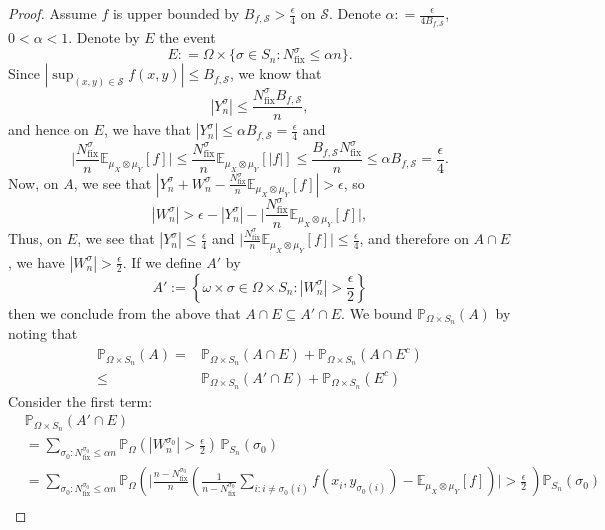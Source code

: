 \documentclass[12pt]{article}
\newcommand{\EE}{\mathbb{E}}
\newcommand{\PP}{\mathbb{P}}
\theoremstyle{definition}
\begin{document}
\begin{proof}
Assume $f$ is upper bounded by $B_{f,\mathcal{S}}>\frac{\epsilon}{4}$ on $\mathcal{S}$. Denote $\alpha :  = \frac{\epsilon}{4B_{f,\mathcal{S}}}$, $ 0< \alpha <1 $. 
Denote by $E$ the event
$$
E : = \Omega \times \{\sigma \in S_n:N^{\sigma}_{\text{fix}} \leq \alpha n \}. $$
Since $|\sup_{(x,y) \in \mathcal{S}} f(x,y)| \leq B_{f,\mathcal{S}}$, we know that
$$
|Y_n^{\sigma}| \leq \frac{N^{\sigma}_{\text{fix}}B_{f,\mathcal{S}}}{n},
$$
and hence on $E$, we have that 
$|Y_n^{\sigma}| \leq \alpha B_{f,\mathcal{S}}=\frac{\epsilon}{4}$ and
$$\bigg|\frac{N^{\sigma}_{\text{fix}}}{n} \EE_{ \mu_X \otimes \mu_Y}[f]\bigg| \leq \frac{N^{\sigma}_{\text{fix}}}{n} \EE_{ \mu_X \otimes \mu_Y}[|f|] \leq  \frac{B_{f,\mathcal{S}} N^{\sigma}_{\text{fix}}}{n} \leq \alpha B_{f,\mathcal{S}}=\frac{\epsilon}{4}.
$$
Now, on $A$, we see that   
$|Y_n^{\sigma}+W_n^{\sigma} - \frac{N^{\sigma}_{\text{fix}}}{n} \EE_{ \mu_X \otimes \mu_Y}[f] | > \epsilon
$, so 
$$
|W_n^{\sigma} | > \epsilon - |Y_n^{\sigma}| - \bigg|\frac{N^{\sigma}_{\text{fix}}}{n} \EE_{ \mu_X \otimes \mu_Y}[f]\bigg|,
$$ 
Thus, on $E$, we see that $|Y_n^{\sigma}| \leq \frac{\epsilon}{4}$ and $\bigg|\frac{N^{\sigma}_{\text{fix}}}{n} \EE_{ \mu_X \otimes \mu_Y}[f]\bigg| \leq \frac{\epsilon}{4} $, and therefore on $A \cap E$, we have $|W_n^{\sigma}| > \frac{\epsilon}{2}$.
If we define $A'$ by
$$
A' := \left\{ \omega \times \sigma \in \Omega \times S_n:  |W_n^{\sigma}| > \frac{\epsilon}{2} \right\}
$$
then we conclude from the above that
$A \cap E \subseteq A' \cap E.$
We bound $\PP_{\Omega \times S_n}(A)$ by noting that 
\begin{align*}
\PP_{\Omega \times S_n}(A) = & \PP_{\Omega \times S_n}(A\cap E) + \PP_{\Omega \times S_n}(A \cap E^c) \\
\le & \PP_{\Omega \times S_n}(A' \cap E) + \PP_{\Omega \times S_n}(E^c)
\end{align*}
Consider the first term:
\[
\begin{aligned}
&\PP_{\Omega \times S_n}(A' \cap E) \\
& =\sum_{\sigma_0: N^{\sigma_0}_{\text{fix}} \leq \alpha n }  
\PP_{\Omega}\!\left(|W_n^{\sigma_0}|>\frac{\epsilon}{2}\right) \, \PP_{S_n}(\sigma_0) \quad %
\\
& = \sum_{\sigma_0: N^{\sigma_0}_{\text{fix}} \leq \alpha n }  \PP_{\Omega}\left( \bigg|\frac{n-N^{\sigma_0}_{\text{fix}}}{n} \left(\frac{1}{n-N^{\sigma_0}_{\text{fix}}} \sum_{i:i \neq \sigma_0(i)}  f\left(x_i, y_{\sigma_0(i)}\right) - \EE_{ \mu_X \otimes \mu_Y}[f]  \right) \bigg|> \frac{\epsilon}{2}  ~  \right)\PP_{S_n}(\sigma_0) \\

\end{aligned}\]
\end{proof}
\end{document}
